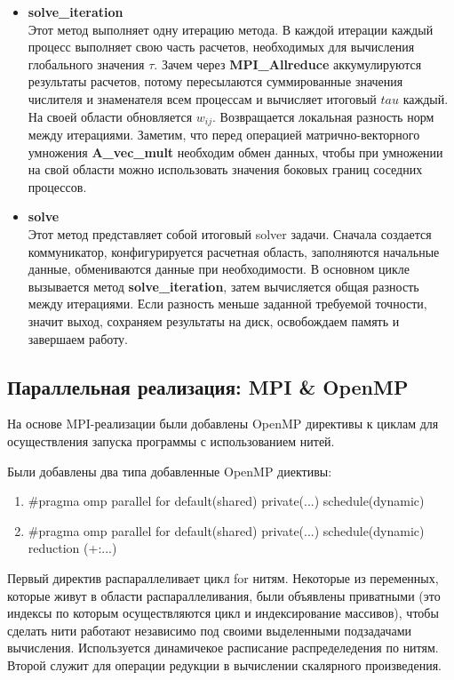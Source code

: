 \documentclass{article}
\begin{document}
\begin{itemize}
    \item \textbf{solve\_iteration}\\
    Этот метод выполняет одну итерацию метода. В каждой итерации каждый процесс выполняет свою часть расчетов, необходимых для вычисления глобального значения $\tau$. Зачем через \textbf{MPI\_Allreduce} аккумулируются результаты расчетов, потому пересылаются суммированные значения числителя и знаменателя всем процессам и вычисляет итоговый $tau$ каждый. На своей области обновляется $w_{ij}$. Возвращается локальная разность норм между итерациями.
    Заметим, что перед операцией матрично-векторного умножения \textbf{A\_vec\_mult} необходим обмен данных, чтобы при умножении на свой области можно использовать значения боковых границ соседних процессов. 

    \item \textbf{solve}\\
    Этот метод представляет собой итоговый solver задачи. Сначала создается коммуникатор, конфигурируется расчетная область, заполняются начальные данные, обмениваются данные при необходимости. В основном цикле вызывается метод \textbf{solve\_iteration}, затем вычисляется общая разность между итерациями. Если разность меньше заданной требуемой точности, значит выход, сохраняем результаты на диск, освобождаем память и завершаем работу.
    
\end{itemize}

\subsection{Параллельная реализация: MPI \& OpenMP}
На основе MPI-реализации были добавлены OpenMP директивы к циклам для осуществления запуска программы с использованием нитей. 

Были добавлены два типа добавленные OpenMP диективы:
\begin{enumerate}
    \item \#pragma omp parallel for default(shared) private(...) schedule(dynamic)
    \item \#pragma omp parallel for default(shared) private(...) schedule(dynamic) reduction (+:...)
\end{enumerate}
Первый директив распараллеливает цикл for нитям. Некоторые из переменных, которые живут в области распараллеливания, были объявлены приватными (это индексы по которым осуществляются цикл и индексирование массивов), чтобы сделать нити работают независимо под своими выделенными подзадачами вычисления. Используется динамичекое расписание распределедения по нитям. Второй служит для операции редукции в вычислении скалярного произведения.
\end{document}

